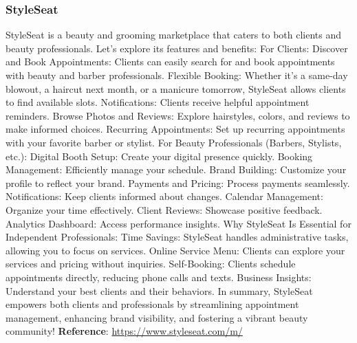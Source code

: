 \documentclass{article}
\begin{document}
      \subsubsection{StyleSeat}
      StyleSeat is a beauty and grooming marketplace that caters to both clients and beauty professionals. Let’s explore its features and benefits:
      For Clients:
      Discover and Book Appointments: Clients can easily search for and book appointments with beauty and barber professionals.
      Flexible Booking: Whether it’s a same-day blowout, a haircut next month, or a manicure tomorrow, StyleSeat allows clients to find available slots.
      Notifications: Clients receive helpful appointment reminders.
      Browse Photos and Reviews: Explore hairstyles, colors, and reviews to make informed choices.
      Recurring Appointments: Set up recurring appointments with your favorite barber or stylist.
      For Beauty Professionals (Barbers, Stylists, etc.):
      Digital Booth Setup: Create your digital presence quickly.
      Booking Management: Efficiently manage your schedule.
      Brand Building: Customize your profile to reflect your brand.
      Payments and Pricing: Process payments seamlessly.
      Notifications: Keep clients informed about changes.
      Calendar Management: Organize your time effectively.
      Client Reviews: Showcase positive feedback.
      Analytics Dashboard: Access performance insights.
      Why StyleSeat Is Essential for Independent Professionals:
      Time Savings: StyleSeat handles administrative tasks, allowing you to focus on services.
      Online Service Menu: Clients can explore your services and pricing without inquiries.
      Self-Booking: Clients schedule appointments directly, reducing phone calls and texts.
      Business Insights: Understand your best clients and their behaviors.
      In summary, StyleSeat empowers both clients and professionals by streamlining appointment management, enhancing brand visibility, and fostering a vibrant beauty community!\newline
      \textbf{Reference}: \href{https://www.styleseat.com/m/}{https://www.styleseat.com/m/}
      
\end{document}
